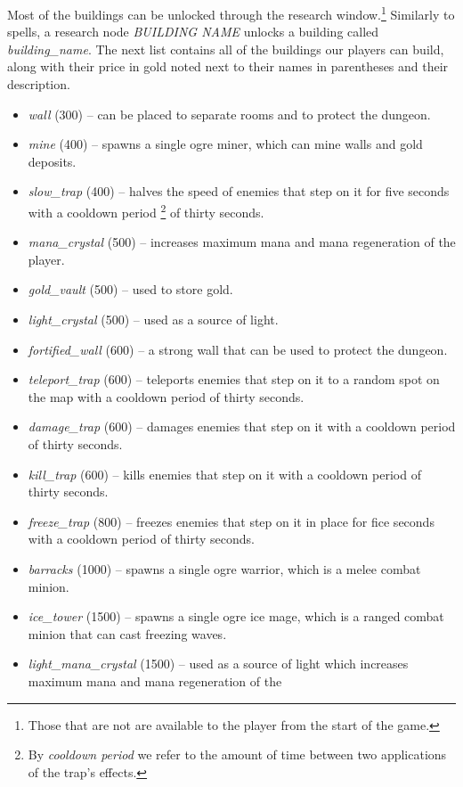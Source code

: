 Most of the buildings can be unlocked through the research window.\footnote{Those that are not are available to the player from the start of
the game.} Similarly to spells, a research node \emph{BUILDING NAME} unlocks a
building called \emph{building\_name}. The next list contains all of the buildings our players can build, along with their price
in gold noted next to their names in parentheses and their description.

\begin{itemize}
    \item \emph{wall} (300) -- can be placed to separate rooms and to protect the dungeon.
    \item \emph{mine} (400) -- spawns a single ogre miner, which can mine walls and gold deposits.
    \item \emph{slow\_trap} (400) -- halves the speed of enemies that step on it for five seconds with a cooldown period
        \footnote{By \emph{cooldown period} we refer to the amount of time between two applications of the trap's effects.}
        of thirty seconds.
    \item \emph{mana\_crystal} (500) -- increases maximum mana and mana regeneration of the player.
    \item \emph{gold\_vault} (500) -- used to store gold.
    \item \emph{light\_crystal} (500) -- used as a source of light.
    \item \emph{fortified\_wall} (600) -- a strong wall that can be used to protect the dungeon.
    \item \emph{teleport\_trap} (600) -- teleports enemies that step on it to a random spot on the map with a cooldown period
        of thirty seconds.
    \item \emph{damage\_trap} (600) -- damages enemies that step on it with a cooldown period of thirty seconds.
    \item \emph{kill\_trap} (600) -- kills enemies that step on it with a cooldown period of thirty seconds.
    \item \emph{freeze\_trap} (800) -- freezes enemies that step on it in place for fice seconds with a cooldown period of thirty seconds.
    \item \emph{barracks} (1000) -- spawns a single ogre warrior, which is a melee combat minion.
    \item \emph{ice\_tower} (1500) -- spawns a single ogre ice mage, which is a ranged combat minion that can cast freezing waves.
    \item \emph{light\_mana\_crystal} (1500) -- used as a source of light which increases maximum mana and mana regeneration of the

\end{itemize}
